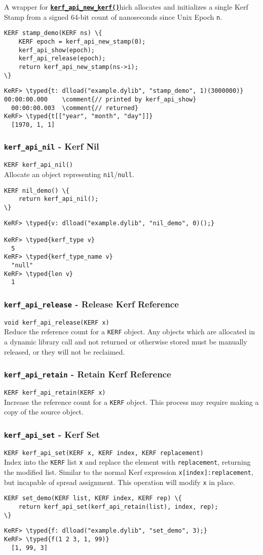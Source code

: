 \documentclass{article}
\newcommand{\typed}[1]{\textcolor{TealBlue}{#1}}
\newcommand{\comment}[1]{\textcolor{Orange}{#1}}
\newcommand{\ffidef}[3]{\subsubsection{\texttt{#1} - #2}\label{ffi:#3}}
\newcommand{\ffi}[2]{\hyperref[ffi:#2]{\textbf{\texttt{#1}}}}
\begin{document}
A wrapper for \ffi{kerf\_api\_new\_kerf()} which allocates and initializes a single Kerf Stamp from a signed 64-bit count of nanoseconds since Unix Epoch \texttt{n}.
\begin{Verbatim}
KERF stamp_demo(KERF ns) \{
	KERF epoch = kerf_api_new_stamp(0);
	kerf_api_show(epoch);
	kerf_api_release(epoch);
	return kerf_api_new_stamp(ns->i);
\}
\end{Verbatim}
\begin{Verbatim}
KeRF> \typed{t: dlload("example.dylib", "stamp_demo", 1)(3000000)}
00:00:00.000    \comment{// printed by kerf_api_show}
  00:00:00.003  \comment{// returned}
KeRF> \typed{t[["year", "month", "day"]]}
  [1970, 1, 1]
\end{Verbatim}

\ffidef{kerf\_api\_nil}{Kerf Nil}{kerfApiNil}
\texttt{KERF kerf\_api\_nil()}\\

Allocate an object representing \texttt{nil}/\texttt{null}.
\begin{Verbatim}
KERF nil_demo() \{
	return kerf_api_nil();
\}
\end{Verbatim}
\begin{Verbatim}
KeRF> \typed{v: dlload("example.dylib", "nil_demo", 0)();}
  
KeRF> \typed{kerf_type v}
  5
KeRF> \typed{kerf_type_name v}
  "null"
KeRF> \typed{len v}
  1
\end{Verbatim}

\ffidef{kerf\_api\_release}{Release Kerf Reference}{kerfApiRelease}
\texttt{void kerf\_api\_release(KERF x)}\\

Reduce the reference count for a \texttt{KERF} object. Any objects which are allocated in a dynamic library call and not returned or otherwise stored must be manually released, or they will not be reclaimed.

\ffidef{kerf\_api\_retain}{Retain Kerf Reference}{kerfApiRetain}
\texttt{KERF kerf\_api\_retain(KERF x)}\\

Increase the reference count for a \texttt{KERF} object. This process may require making a copy of the source object.

\ffidef{kerf\_api\_set}{Kerf Set}{kerfApiSet}
\texttt{KERF kerf\_api\_set(KERF x, KERF index, KERF replacement)}\\

Index into the \texttt{KERF} list \texttt{x} and replace the element with \texttt{replacement}, returning the modified list. Similar to the normal Kerf expression \texttt{x[index]:replacement}, but incapable of spread assignment. This operation will modify \texttt{x} in place.
\begin{Verbatim}
KERF set_demo(KERF list, KERF index, KERF rep) \{
	return kerf_api_set(kerf_api_retain(list), index, rep);
\}
\end{Verbatim}
\begin{Verbatim}
KeRF> \typed{f: dlload("example.dylib", "set_demo", 3);}
KeRF> \typed{f(1 2 3, 1, 99)}
  [1, 99, 3]
\end{Verbatim}
\end{document}
